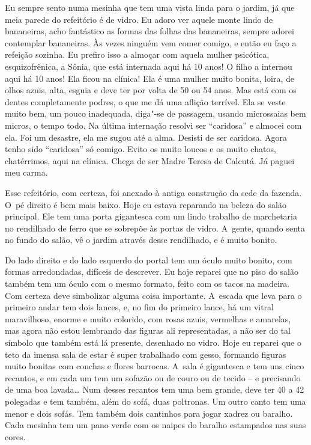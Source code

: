 Eu sempre sento numa mesinha que tem uma vista linda para o jardim, já
que meia parede do refeitório é de vidro. Eu adoro ver aquele monte
lindo de bananeiras, acho fantástico as formas das folhas das
bananeiras, sempre adorei contemplar bananeiras. Às vezes ninguém vem
comer comigo, e então eu faço a refeição sozinha. Eu prefiro isso a
almoçar com aquela mulher psicótica, esquizofrênica, a Sônia, que está
internada aqui há 10 anos! O filho a internou aqui há 10 anos! Ela ficou
 na clínica! Ela é uma mulher muito bonita, loira, de olhos
azuis, alta, esguia e deve ter por volta de 50 ou 54 anos. Mas está com
os dentes completamente podres, o que me dá uma aflição terrível. Ela se
veste muito bem, um pouco inadequada, diga"-se de passagem, usando
microssaias bem micros, o tempo todo. Na última internação resolvi ser
``caridosa'' e almocei com ela. Foi um desastre, ela me sugou até a
alma. Desisti de ser caridosa. Agora tenho sido ``caridosa'' só comigo.
Evito os muito loucos e os muito chatos, chatérrimos, aqui na clínica.
Chega de ser Madre Teresa de Calcutá. Já paguei meu carma.

Esse refeitório, com certeza, foi anexado à antiga construção da sede da
fazenda. O~pé direito é bem mais baixo. Hoje eu estava reparando na
beleza do salão principal. Ele tem uma porta gigantesca com um lindo
trabalho de marchetaria no rendilhado de ferro que se sobrepõe às portas
de vidro. A~gente, quando senta no fundo do salão, vê o jardim através
desse rendilhado, e é muito bonito.

Do lado direito e do lado esquerdo do portal tem um óculo muito bonito,
com formas arredondadas, difíceis de descrever. Eu hoje reparei que no
piso do salão também tem um óculo com o mesmo formato, feito com os
tacos na madeira. Com certeza deve simbolizar alguma coisa importante. 
A~escada que leva para o primeiro andar tem dois lances, e, no fim do
primeiro lance, há um vitral maravilhoso, enorme e muito colorido, com
rosas azuis, vermelhas e amarelas, mas agora não estou lembrando das
figuras ali representadas, a não ser do tal símbolo que também está lá
presente, desenhado no vidro. Hoje eu reparei que o teto da imensa sala
de estar é super trabalhado com gesso, formando figuras muito bonitas
com conchas e flores barrocas. A~sala é gigantesca e tem uns cinco
recantos, e em cada um tem um sofazão ou de couro ou de tecido -- e
precisando de uma boa lavada… Num desses recantos tem uma  bem
grande, deve ter 40 a 42 polegadas e tem também, além do sofá, duas
poltronas. Um outro canto tem uma  menor e dois sofás. Tem também dois
cantinhos para jogar xadrez ou baralho. Cada mesinha tem um pano verde
com os naipes do baralho estampados nas suas cores.

